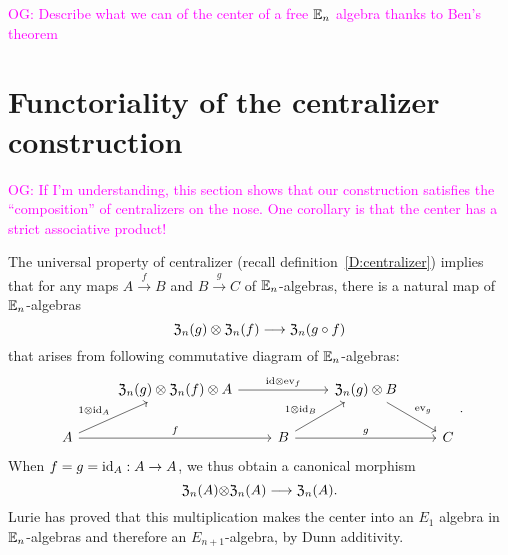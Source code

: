 \documentclass[11pt]{amsart}
\numberwithin{equation}{section}
\def\owen{\textcolor{magenta}{OG: }\textcolor{magenta}}
\begin{document}
\owen{Describe what we can of the center of a free $\mathbb E_n$ algebra thanks to Ben's theorem}

\section{Functoriality of the centralizer construction}
\label{S:centerinFacAlg}

\owen{If I'm understanding, this section shows that our construction satisfies the ``composition'' of centralizers on the nose. One corollary is that the center has a strict associative product!}

The universal property of centralizer (recall definition~\ref{D:centralizer}) implies that 
for any maps $A\stackrel{f}\to B$ and $B\stackrel{g}\to C$ of $\mathbb E_n$-algebras, 
there is a natural map of $\mathbb E_n$-algebras
\begin{equation}
\label{eqdef:canonicaltocentralizers} 
{\frak Z}_n(g) \otimes {\frak Z}_n(f) \longrightarrow {\frak Z}_n(g\circ f)
\end{equation}
that arises from following commutative diagram of $\mathbb E_n$-algebras:
\[
\begin{tikzcd}
&   {\frak Z}_n(g) \otimes  {\frak Z}_n(f) \otimes A \arrow[rr, "\id\otimes \ev_f"] &&  {\frak Z}_n(g) \otimes  B \arrow[dr, "\ev_g"]\\
A \arrow[ur, "1\otimes \id_A"] \arrow[rr, "f"] && B \arrow[rr, "g"] \arrow[ur, "1\otimes \id_B"] && C 
\end{tikzcd}.
\]
When $f=g={\rm id}_A:A\to A$, we thus obtain a canonical morphism 
\begin{equation} 
\label{eq:dgAssofcenter}
{\frak Z}_n(A){\otimes} {\frak Z}_n(A) \longrightarrow {\frak Z}_n(A).
\end{equation}
Lurie \cite{HA} has proved that this multiplication makes the center into an $E_1$ algebra in $\mathbb E_n$-algebras 
and therefore an $E_{n+1}$-algebra, by Dunn additivity. 
%
\end{document}
